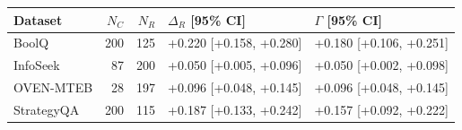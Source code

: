 \begin{tabular}{lrrll}
\toprule
Dataset & $N_C$ & $N_R$ & $\Delta_R$ [95\% CI] & $\Gamma$ [95\% CI] \\
\midrule
BoolQ & 200 & 125 & +0.220 [+0.158, +0.280] & +0.180 [+0.106, +0.251] \\
InfoSeek & 87 & 200 & +0.050 [+0.005, +0.096] & +0.050 [+0.002, +0.098] \\
OVEN-MTEB & 28 & 197 & +0.096 [+0.048, +0.145] & +0.096 [+0.048, +0.145] \\
StrategyQA & 200 & 115 & +0.187 [+0.133, +0.242] & +0.157 [+0.092, +0.222] \\
\bottomrule
\end{tabular}
